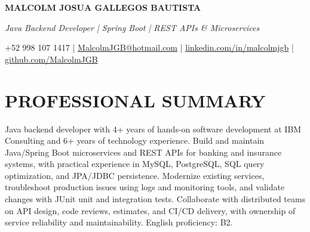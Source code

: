 \documentclass[10pt,a4paper]{article}
\newlength{\namefontsize}
\newlength{\documentfontsize}
\newlength{\singlelinespacing}
\newlength{\singleseparation}
\begin{document}
\fontsize{\documentfontsize}{\singlelinespacing} \selectfont
{\fontsize{\namefontsize}{\singlelinespacing} \selectfont \bfseries MALCOLM JOSUA GALLEGOS BAUTISTA} \par
\textit{Java Backend Developer | Spring Boot | REST APIs \& Microservices} \par
{+52 998 107 1417 | \href{mailto:MalcolmJGB@hotmail.com}{MalcolmJGB@hotmail.com} | \href{https://linkedin.com/in/malcolmjgb}{linkedin.com/in/malcolmjgb} | \href{https://github.com/MalcolmJGB}{github.com/MalcolmJGB}} \par

\section*{PROFESSIONAL SUMMARY}
\vspace{\singleseparation}
Java backend developer with 4+ years of hands-on software development at IBM Consulting and 6+ years of technology experience. Build and maintain Java/Spring Boot microservices and REST APIs for banking and insurance systems, with practical experience in MySQL, PostgreSQL, SQL query optimization, and JPA/JDBC persistence. Modernize existing services, troubleshoot production issues using logs and monitoring tools, and validate changes with JUnit unit and integration tests. Collaborate with distributed teams on API design, code reviews, estimates, and CI/CD delivery, with ownership of service reliability and maintainability. English proficiency: B2. \par
\end{document}

